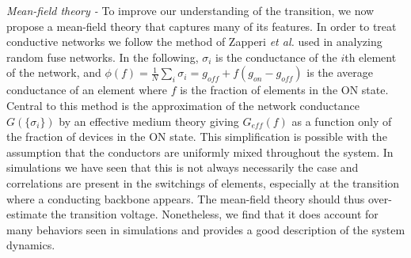 \documentclass[aps,prl,reprint,groupedaddress]{revtex4-1}
\begin{document}
{\it Mean-field theory -}  To improve our understanding of the transition, we now
propose a mean-field theory that captures many of its features. In order to treat conductive networks we follow the method of Zapperi {\it et al.}
\cite{Zapperi1999} used in analyzing random fuse networks.  In the following,
$\sigma_i$ is the conductance of the $i$th element of the network,
and \(\phi(f) = \frac{1}{N}\sum_i \sigma_i = g_{off} + f (g_{on} - g_{off})\)
is the average conductance of an element where $f$ is the fraction of elements
in the ON state. Central to this method is the approximation of the network
conductance $G(\{\sigma_i\})$ by an effective medium theory giving $G_{eff}(f)$
as a function only of the fraction of devices in the ON state.  This
simplification is possible with the assumption that the conductors are
uniformly mixed throughout the system. In simulations we have seen
that this is not always necessarily the case and correlations are present in the switchings of
elements, especially at the transition where a conducting backbone appears.
The mean-field theory should thus over-estimate the transition voltage. Nonetheless, 
we find that it does account for many behaviors seen in simulations and
provides a good description of the system dynamics.
\end{document}
